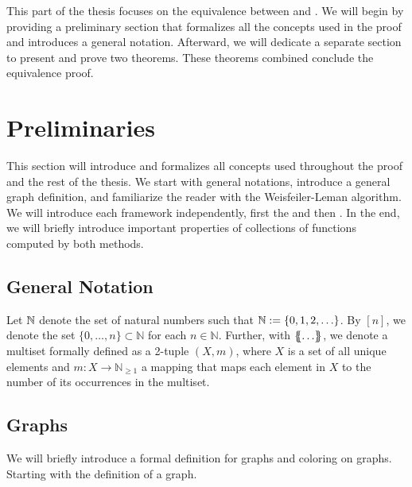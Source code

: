 This part of the thesis focuses on the equivalence between \wlnn and \gnn. We will begin by providing a preliminary section that formalizes all the concepts used in the proof and introduces a general notation. Afterward, we will dedicate a separate section to present and prove two theorems. These theorems combined conclude the equivalence proof.

\section{Preliminaries}\label{sec:pre_lim}
This section will introduce and formalizes all concepts used throughout the proof and the rest of the thesis. We start with general notations, introduce a general graph definition, and familiarize the reader with the Weisfeiler-Leman algorithm. We will introduce each framework independently, first the \wlnn and then \gnn. In the end, we will briefly introduce important properties of collections of functions computed by both methods.

\subsection{General Notation}
Let $\mathbb{N}$ denote the set of natural numbers such that $\mathbb{N} := \{0, 1,2, \ldots \}$. By $[n]$, we denote the set $\{0, \ldots, n\} \subset \mathbb{N}$ for each $n \in \mathbb{N}$. Further, with $\{\!\!\{ \ldots \}\!\!\}$, we denote a multiset formally defined as a 2-tuple $(X, m)$, where $X$ is a set of all unique elements and $m: X \rightarrow \mathbb{N}_{\geq 1}$ a mapping that maps each element in $X$ to the number of its occurrences in the multiset.

\subsection{Graphs}
We will briefly introduce a formal definition for graphs and coloring on graphs. Starting with the definition of a graph.


